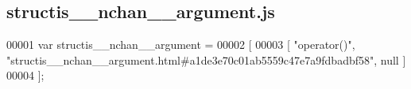 \subsection{structis\+\_\+\+\_\+nchan\+\_\+\+\_\+argument.\+js}
\label{structis____nchan____argument_8js_source}

\begin{DoxyCode}
00001 var structis__nchan__argument =
00002 [
00003     [ \textcolor{stringliteral}{"operator()"}, \textcolor{stringliteral}{"structis\_\_nchan\_\_argument.html#a1de3e70c01ab5559c47e7a9fdbadbf58"}, null ]
00004 ];
\end{DoxyCode}
